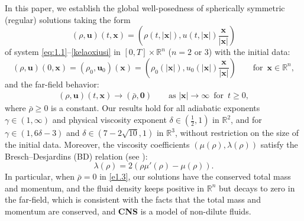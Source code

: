 \documentclass[11pt,reqno]{amsart}
\numberwithin{rk}{section}
\numberwithin{prop}{section}
\numberwithin{mydef}{section}
\numberwithin{lem}{section}
\numberwithin{equation}{section}
\numberwithin{thm}{section}
\begin{document}
In this  paper,  we   establish   the global well-posedness   of spherically symmetric (regular) solutions taking the form 
\begin{equation*}
\displaystyle
(\rho,\boldsymbol{u})(t,\boldsymbol{x})
=(\rho(t,|\boldsymbol{x}|),u(t,|\boldsymbol{x}|) \frac{\boldsymbol{x}}{|\boldsymbol{x}|})
\end{equation*}
of system 
\eqref{eq:1.1}--\eqref{kelaoxiusi} in $[0,T]\times \mathbb{R}^n$ ($n=2$ or $3$) with the initial  data:
\begin{equation}\label{eqs:CauchyInit}
(\rho,\boldsymbol{u})(0,\boldsymbol{x})=(\rho_0,\boldsymbol{u}_0)(\boldsymbol{x})=(\rho_0(|\boldsymbol{x}|),u_0(|\boldsymbol{x}|)\frac{\boldsymbol{x}}{|\boldsymbol{x}|}) 
\qquad \text{for $\,\boldsymbol{x} \in \mathbb{R}^n$},
\end{equation}
and the   far-field behavior:
\begin{equation}\label{e1.3}
\begin{aligned}
\displaystyle
(\rho,\boldsymbol{u})(t,\boldsymbol{x})
\to (\bar \rho,\boldsymbol{0})
\qquad \text{as $|\boldsymbol{x}|\to \infty\,$  for $\,t\ge 0$},
\end{aligned}
\end{equation}
where $\bar \rho \geq 0$ is a constant.
Our results hold for all adiabatic exponents $\gamma\in (1,\infty)$ and  physical  viscosity exponent $ \delta\in (\frac{1}{2},1)$ in $\mathbb{R}^2$, and for $\gamma\in (1,6\delta-3)$ and $\delta 
\in (7-2\sqrt{10},1)$ in $\mathbb{R}^3$, without restriction on the size of the initial data. Moreover, the viscosity coefficients $(\mu(\rho),\lambda(\rho))$ satisfy the Bresch--Desjardins (BD) relation (see \cite{bd3}):
\begin{equation}\label{coeff}
\lambda(\rho)=2(\rho \mu'(\rho)-\mu(\rho)).
\end{equation}
In particular, when $\bar{\rho}=0$ in \eqref{e1.3}, our  solutions have the conserved total mass and momentum, and the fluid density keeps positive in $\mathbb{R}^n$  but decays to zero in the far-field, which is consistent with the facts that the total mass and momentum are conserved, and  \textbf{CNS} is a model of non-dilute fluids.
\end{document}
